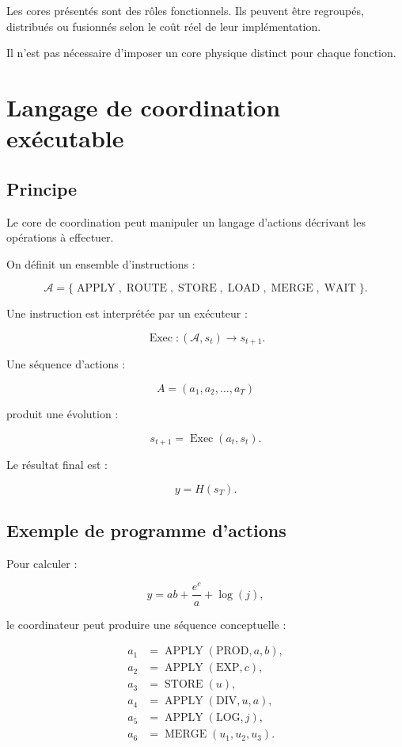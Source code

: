 \documentclass[11pt,a4paper]{article}
\begin{document}
Les cores présentés sont des rôles fonctionnels. Ils peuvent être
regroupés, distribués ou fusionnés selon le coût réel de leur
implémentation.

Il n'est pas nécessaire d'imposer un core physique distinct pour
chaque fonction.

\section{Langage de coordination exécutable}

\subsection{Principe}

Le core de coordination peut manipuler un langage d'actions
décrivant les opérations à effectuer.

On définit un ensemble d'instructions :

\[
\mathcal{A}
=
\{
\operatorname{APPLY},
\operatorname{ROUTE},
\operatorname{STORE},
\operatorname{LOAD},
\operatorname{MERGE},
\operatorname{WAIT}
\}.
\]

Une instruction est interprétée par un exécuteur :

\[
\operatorname{Exec}:
(\mathcal{A},s_t)
\rightarrow
s_{t+1}.
\]

Une séquence d'actions :

\[
A=(a_1,a_2,\ldots,a_T)
\]

produit une évolution :

\[
s_{t+1}
=
\operatorname{Exec}(a_t,s_t).
\]

Le résultat final est :

\[
y=H(s_T).
\]

\subsection{Exemple de programme d'actions}

Pour calculer :

\[
y=ab+\frac{e^c}{a}+\log(j),
\]

le coordinateur peut produire une séquence conceptuelle :

\[
\begin{aligned}
a_1 &= \operatorname{APPLY}(\mathrm{PROD},a,b),\\
a_2 &= \operatorname{APPLY}(\mathrm{EXP},c),\\
a_3 &= \operatorname{STORE}(u),\\
a_4 &= \operatorname{APPLY}(\mathrm{DIV},u,a),\\
a_5 &= \operatorname{APPLY}(\mathrm{LOG},j),\\
a_6 &= \operatorname{MERGE}(u_1,u_2,u_3).
\end{aligned}
\]
\end{document}
